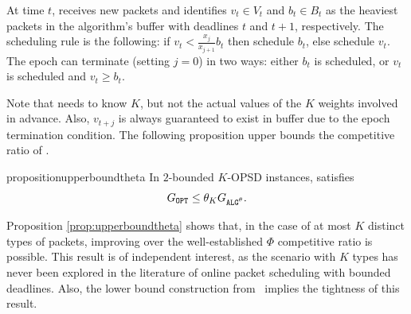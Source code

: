 At time $t$, \algtheta receives new packets and identifies $v_t \in V_t$ and $b_t \in B_t$ as the heaviest packets in the algorithm's buffer with deadlines $t$ and $t+1$, respectively. The scheduling rule is the following: if $v_t < \frac{x_{j}}{x_{j+1}}b_t$ then schedule $b_t$, else schedule $v_t$. The epoch can terminate (setting $j = 0$) in two ways: either $b_t$ is scheduled, or $v_t$ is scheduled and $v_t \ge b_t$.

Note that \algtheta needs to know $K$, but not the actual values of the $K$ weights involved in advance. Also, $v_{t+j}$ is always guaranteed to exist in \algtheta buffer due to the epoch termination condition. The following proposition upper bounds the competitive ratio of \algtheta.
\begin{restatable}{proposition}{upperboundtheta}
\label{prop:upperboundtheta}
In $2$-bounded $K$-OPSD instances, \algtheta satisfies
    $$
     \Gopt \le \theta_K \Galgtheta.
    $$
\end{restatable}
Proposition \ref{prop:upperboundtheta} shows that, in the case of at most $K$ distinct types of packets, improving over the well-established $\Phi$ competitive ratio is possible. This result is of independent interest, as the scenario with $K$ types has never been explored in the literature of online packet scheduling with bounded deadlines. Also, the lower bound construction from~\citep{hajek2001competitiveness} implies the tightness of this result.


